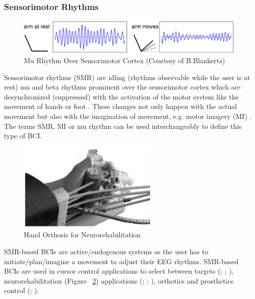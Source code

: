 \documentclass[12pt]{article}
\newcommand\mysubsubsection[1]{\subsubsection{#1}}
\numberwithin{equation}{section}
\numberwithin{figure}{section}
\numberwithin{table}{section}
\begin{document}
\mysubsubsection{Sensorimotor Rhythms}
\par{
    \begin{figure}[ht]
        \centering
        \includegraphics[scale=0.7]{images/motor_imagery}
        \caption[Mu Rhythm Over Sensorimotor Cortex]{Mu Rhythm Over Sensorimotor Cortex (Courtesy of B.Blankertz)}
        \label{fig:eeg_motor_imagery}
    \end{figure}

    Sensorimotor rhythms (SMR) are idling (rhythms observable while the
    user is at rest) mu and beta rhythms prominent over the sensorimotor cortex which are desynchronized
    (suppressed) with the activation of the motor system like the movement
    of hands or foot \citep{sellers_bcis_2010}. These changes not only happen
    with the actual movement but also with the imagination of movement, e.g. motor imagery (MI) \citep{mcfarland_braincomputer_2006}.
    The terms SMR, MI or mu rhythm can be used interchangeably to define this
    type of BCI.
}
\par{
    \begin{figure}[ht]
        \centering
        \includegraphics[width=0.6\textwidth]{images/bci_hand_rehab}
        \caption[Hand Orthosis for Neurorehabilitation]{Hand Orthosis for Neurorehabilitation \citep{ramos-murguialday_proprioceptive_2012}}
        \label{fig:motor_orthosis}
    \end{figure}

    SMR-based BCIs are active/endogenous systems as the user has to initiate/plan/imagine
    a movement to adjust their EEG rhythms. SMR-based BCIs are used in cursor control
    applications to select between targets
    (\citealp{wolpaw_eeg-based_1991}; \citealp{wolpaw_wadsworth_2003}; \citealp{vaughan_wadsworth_2006}),
    neurorehabilitation (Figure ~\ref{fig:motor_orthosis}) applications (\citealp{prasad_using_2009}; \citealp{ramos-murguialday_proprioceptive_2012};
    \citealp{ortner_human-computer_2013}), orthotics and prosthetics control (\citealp{guger_prosthetic_1999}; \citealp{pfurtscheller_motor_2001}).
}
\end{document}
